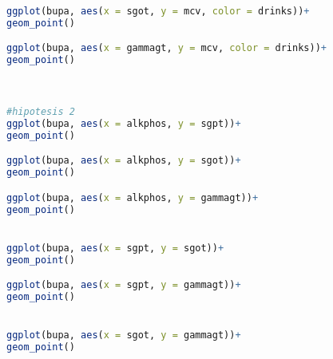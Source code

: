 \begin{lstlisting}[language=R]
ggplot(bupa, aes(x = sgot, y = mcv, color = drinks))+
geom_point() 

ggplot(bupa, aes(x = gammagt, y = mcv, color = drinks))+
geom_point() 



#hipotesis 2
ggplot(bupa, aes(x = alkphos, y = sgpt))+
geom_point() 

ggplot(bupa, aes(x = alkphos, y = sgot))+
geom_point() 

ggplot(bupa, aes(x = alkphos, y = gammagt))+
geom_point() 


ggplot(bupa, aes(x = sgpt, y = sgot))+
geom_point() 

ggplot(bupa, aes(x = sgpt, y = gammagt))+
geom_point() 


ggplot(bupa, aes(x = sgot, y = gammagt))+
geom_point() 
\end{lstlisting}